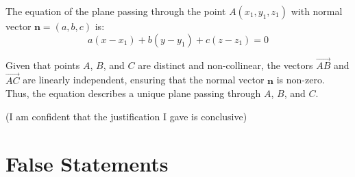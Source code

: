 \documentclass{article}
\begin{document}
\begin{enumerate}
    The equation of the plane passing through the point \(A(x_1, y_1, z_1)\) with normal vector \(\mathbf{n} = (a, b, c)\) is:
    \[
    a(x - x_1) + b(y - y_1) + c(z - z_1) = 0
    \]
    
    Given that points \(A\), \(B\), and \(C\) are distinct and non-collinear, the vectors \(\overrightarrow{AB}\) and \(\overrightarrow{AC}\) are linearly independent, ensuring that the normal vector \(\mathbf{n}\) is non-zero. Thus, the equation describes a unique plane passing through \(A\), \(B\), and \(C\).
    
          (I am confident that the justification I gave is conclusive)
\end{enumerate}

\section{False Statements}
\end{document}
